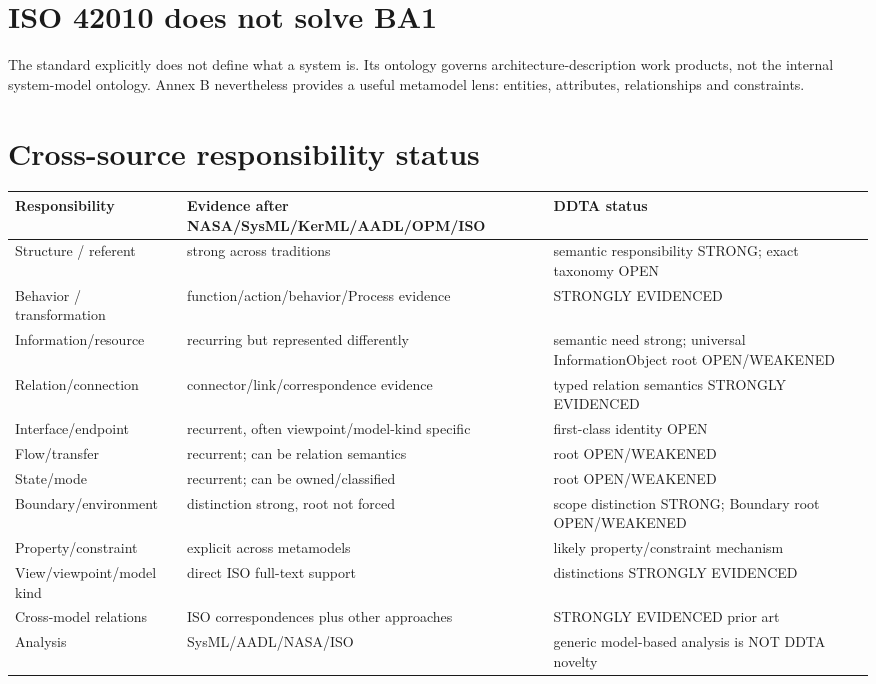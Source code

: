 \documentclass[10pt,a4paper]{article}
\begin{document}
\section{ISO 42010 does not solve BA1}
The standard explicitly does not define what a system is. Its ontology governs architecture-description work products, not the internal system-model ontology. Annex B nevertheless provides a useful metamodel lens: entities, attributes, relationships and constraints.
\section{Cross-source responsibility status}
\begin{landscape}\scriptsize
\begin{longtable}{p{4cm}p{10cm}p{8cm}}
\toprule Responsibility & Evidence after NASA/SysML/KerML/AADL/OPM/ISO & DDTA status\\\midrule\endhead
Structure / referent & strong across traditions & semantic responsibility STRONG; exact taxonomy OPEN\\
Behavior / transformation & function/action/behavior/Process evidence & STRONGLY EVIDENCED\\
Information/resource & recurring but represented differently & semantic need strong; universal InformationObject root OPEN/WEAKENED\\
Relation/connection & connector/link/correspondence evidence & typed relation semantics STRONGLY EVIDENCED\\
Interface/endpoint & recurrent, often viewpoint/model-kind specific & first-class identity OPEN\\
Flow/transfer & recurrent; can be relation semantics & root OPEN/WEAKENED\\
State/mode & recurrent; can be owned/classified & root OPEN/WEAKENED\\
Boundary/environment & distinction strong, root not forced & scope distinction STRONG; Boundary root OPEN/WEAKENED\\
Property/constraint & explicit across metamodels & likely property/constraint mechanism\\
View/viewpoint/model kind & direct ISO full-text support & distinctions STRONGLY EVIDENCED\\
Cross-model relations & ISO correspondences plus other approaches & STRONGLY EVIDENCED prior art\\
Analysis & SysML/AADL/NASA/ISO & generic model-based analysis is NOT DDTA novelty\\
\bottomrule\end{longtable}\end{landscape}
\end{document}
